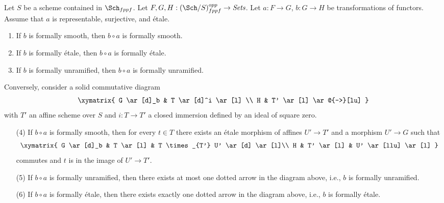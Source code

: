 \begin{lemma}
\label{lemma-etale-on-top}
Let $S$ be a scheme contained in $\Sch_{fppf}$.
Let $F, G, H : (\Sch/S)_{fppf}^{opp} \to \textit{Sets}$.
Let $a : F \to G$, $b : G \to H$ be transformations of functors.
Assume that $a$ is representable, surjective, and \'etale.
\begin{enumerate}
\item If $b$ is formally smooth, then $b \circ a$ is formally smooth.
\item If $b$ is formally \'etale, then $b \circ a$ is formally \'etale.
\item If $b$ is formally unramified, then $b \circ a$ is formally unramified.
\end{enumerate}
Conversely, consider a solid commutative diagram
$$
\xymatrix{
G \ar[d]_b & T \ar[d]^i \ar[l] \\
H & T' \ar[l] \ar@{-->}[lu]
}
$$
with $T'$ an affine scheme over $S$
and $i : T \to T'$ a closed immersion defined by an ideal of square zero.
\begin{enumerate}
\item[(4)] If $b \circ a$ is formally smooth, then for every $t \in T$
there exists an \'etale morphism of affines $U' \to T'$ and a morphism
$U' \to G$ such that
$$
\xymatrix{
G \ar[d]_b & T \ar[l] & T \times_{T'} U' \ar[d] \ar[l]\\
H & T' \ar[l] & U' \ar[llu] \ar[l]
}
$$
commutes and $t$ is in the image of $U' \to T'$.
\item[(5)] If $b \circ a$ is formally unramified, then there exists at most
one dotted arrow in the diagram above, i.e., $b$ is formally unramified.
\item[(6)] If $b \circ a$ is formally \'etale, then there exists exactly one
dotted arrow in the diagram above, i.e., $b$ is formally \'etale.
\end{enumerate}
\end{lemma}

